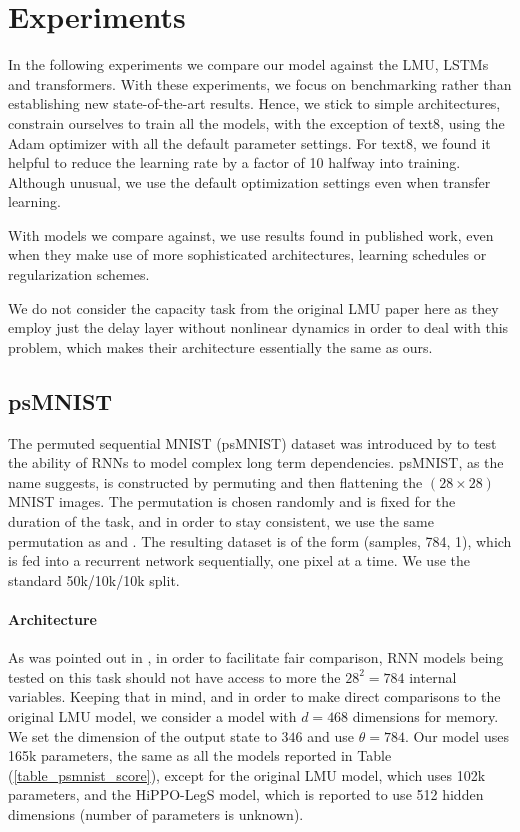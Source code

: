 \documentclass{article}
\begin{document}
\section{Experiments}

In the following experiments we compare our model against the LMU, LSTMs and transformers. With these experiments, we focus on benchmarking rather than establishing new state-of-the-art results. Hence, we stick to simple architectures, constrain ourselves to train all the models, with the exception of text8, using the Adam optimizer \cite{kingma2014adam} with all the default parameter settings. For text8, we found it helpful to reduce the learning rate by a factor of 10 halfway into training. Although unusual, we use the default optimization settings even when transfer learning. 

With models we compare against, we use results found in published work, even when they make use of more sophisticated architectures, learning schedules or regularization schemes.

We do not consider the capacity task from the original LMU paper here as they employ just the delay layer without nonlinear dynamics in order to deal with this problem, which makes their architecture essentially the same as ours.

\subsection{psMNIST}

 The permuted sequential MNIST (psMNIST) dataset was introduced by \citet{le2015simple} to test the ability of RNNs to model complex long term dependencies. psMNIST, as the name suggests, is constructed by permuting and then flattening the $(28 \times 28)$ MNIST images. The permutation is chosen randomly and is fixed for the duration of the task, and in order to stay consistent, we use the same permutation as \citet{chandar2019towards} and \citet{voelker2019legendre}. The resulting dataset is of the form (samples, 784, 1), which is fed into a recurrent network sequentially, one pixel at a time. We use the standard 50k/10k/10k split. 

\paragraph{Architecture} As was pointed out in \citet{voelker2019legendre}, in order to facilitate fair comparison, RNN models being tested on this task should not have access to more the $28^2=784$ internal variables. Keeping that in mind, and in order to make direct comparisons to the original LMU model, we consider a model with $d=468$ dimensions for memory. We set the dimension of the output state to $346$ and use $\theta=784$. Our model uses 165k parameters, the same as all the models reported in Table (\ref{table_psmnist_score}), except for the original LMU model, which uses 102k parameters, and the HiPPO-LegS model, which is reported to use 512 hidden dimensions (number of parameters is unknown).
\end{document}

